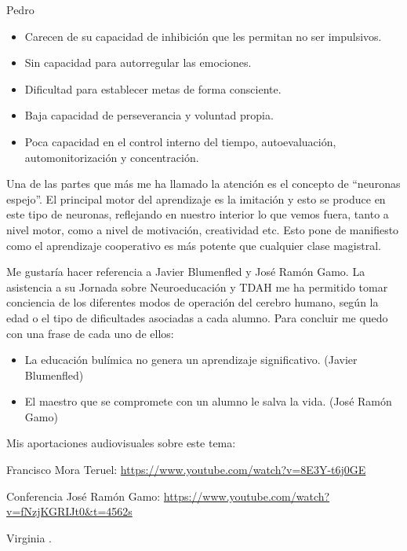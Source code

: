 \begin{opin}{\pedrocolor}{Pedro}
\begin{itemize}
\item Carecen de su capacidad de inhibición que les permitan no ser impulsivos. 

\item Sin capacidad para autorregular las emociones. 

\item Dificultad para establecer metas de forma consciente.  

\item Baja capacidad de perseverancia y voluntad propia. 

\item Poca capacidad en el control interno del tiempo, autoevaluación, automonitorización y  concentración. 

\end{itemize} 

 

Una de las partes que más me ha llamado la atención es el concepto de “neuronas espejo”. El principal motor del aprendizaje es la imitación y esto se produce en este tipo de neuronas, reflejando en nuestro interior lo que vemos fuera, tanto a nivel motor, como a nivel de motivación, creatividad etc. Esto pone de manifiesto como el aprendizaje cooperativo es más potente que cualquier clase magistral.

Me gustaría hacer referencia a Javier Blumenfled y José Ramón Gamo. La asistencia a su Jornada sobre Neuroeducación y TDAH me ha permitido tomar conciencia de los diferentes modos de operación del cerebro humano, según la edad o el tipo de dificultades asociadas a cada alumno. Para concluir me quedo con una frase de cada uno de ellos:

\begin{itemize}

\item La educación bulímica no genera un aprendizaje significativo. (Javier Blumenfled) 

\item El maestro que se compromete con un alumno le salva la vida.  (José Ramón Gamo) 
\end{itemize}
 

Mis aportaciones audiovisuales sobre este tema:

Francisco Mora Teruel: \url{https://www.youtube.com/watch?v=8E3Y-t6j0GE}   

Conferencia José Ramón Gamo: \url{https://www.youtube.com/watch?v=fNzjKGRIJt0&t=4562s}

\end{opin}

\begin{opin}{\virgicolor}{Virginia}
.


\end{opin}
